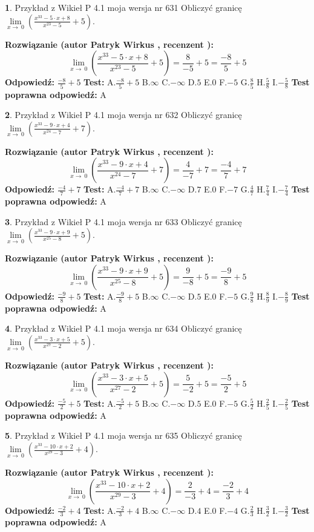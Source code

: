 \documentclass[12pt, a4paper]{article}
\theoremstyle{definition} %
\newtheorem{zad}{}
\newcommand{\zadStart}[1]{\begin{zad}#1\newline}
\newcommand{\zadStop}{\end{zad}}
\newcommand{\rozwStart}[2]{\noindent \textbf{Rozwiązanie (autor #1 , recenzent #2): }\newline}
\newcommand{\rozwStop}{\newline}
\newcommand{\odpStart}{\noindent \textbf{Odpowiedź:}\newline}
\newcommand{\odpStop}{\newline}
\newcommand{\testStart}{\noindent \textbf{Test:}\newline}
\newcommand{\testStop}{\newline}
\newcommand{\kluczStart}{\noindent \textbf{Test poprawna odpowiedź:}\newline}
\newcommand{\kluczStop}{\newline}
\begin{document}
\zadStart{Przykład z Wikieł P 4.1 moja wersja nr 631}
Obliczyć granicę $\lim\limits_{x\to\ 0}(\frac{x^{33}-5 \cdot x +8}{x^{23}-5}+5)$.
\zadStop
\rozwStart{Patryk Wirkus}{}
$$\lim\limits_{x\to\ 0}(\frac{x^{33}-5 \cdot x +8}{x^{23}-5}+5)=\frac{8}{-5}+5=\frac{-8}{5}+5$$
\rozwStop
\odpStart
$\frac{-8}{5}+5$
\odpStop
\testStart
A.$\frac{-8}{5}+5$
B.$\infty$
C.$-\infty$
D.$5$
E.$0$
F.$-5$
G.$\frac{8}{5}$
H.$\frac{5}{8}$
I.$-\frac{5}{8}$
\testStop
\kluczStart
A
\kluczStop



\zadStart{Przykład z Wikieł P 4.1 moja wersja nr 632}
Obliczyć granicę $\lim\limits_{x\to\ 0}(\frac{x^{33}-9 \cdot x +4}{x^{24}-7}+7)$.
\zadStop
\rozwStart{Patryk Wirkus}{}
$$\lim\limits_{x\to\ 0}(\frac{x^{33}-9 \cdot x +4}{x^{24}-7}+7)=\frac{4}{-7}+7=\frac{-4}{7}+7$$
\rozwStop
\odpStart
$\frac{-4}{7}+7$
\odpStop
\testStart
A.$\frac{-4}{7}+7$
B.$\infty$
C.$-\infty$
D.$7$
E.$0$
F.$-7$
G.$\frac{4}{7}$
H.$\frac{7}{4}$
I.$-\frac{7}{4}$
\testStop
\kluczStart
A
\kluczStop



\zadStart{Przykład z Wikieł P 4.1 moja wersja nr 633}
Obliczyć granicę $\lim\limits_{x\to\ 0}(\frac{x^{33}-9 \cdot x +9}{x^{25}-8}+5)$.
\zadStop
\rozwStart{Patryk Wirkus}{}
$$\lim\limits_{x\to\ 0}(\frac{x^{33}-9 \cdot x +9}{x^{25}-8}+5)=\frac{9}{-8}+5=\frac{-9}{8}+5$$
\rozwStop
\odpStart
$\frac{-9}{8}+5$
\odpStop
\testStart
A.$\frac{-9}{8}+5$
B.$\infty$
C.$-\infty$
D.$5$
E.$0$
F.$-5$
G.$\frac{9}{8}$
H.$\frac{8}{9}$
I.$-\frac{8}{9}$
\testStop
\kluczStart
A
\kluczStop



\zadStart{Przykład z Wikieł P 4.1 moja wersja nr 634}
Obliczyć granicę $\lim\limits_{x\to\ 0}(\frac{x^{33}-3 \cdot x +5}{x^{27}-2}+5)$.
\zadStop
\rozwStart{Patryk Wirkus}{}
$$\lim\limits_{x\to\ 0}(\frac{x^{33}-3 \cdot x +5}{x^{27}-2}+5)=\frac{5}{-2}+5=\frac{-5}{2}+5$$
\rozwStop
\odpStart
$\frac{-5}{2}+5$
\odpStop
\testStart
A.$\frac{-5}{2}+5$
B.$\infty$
C.$-\infty$
D.$5$
E.$0$
F.$-5$
G.$\frac{5}{2}$
H.$\frac{2}{5}$
I.$-\frac{2}{5}$
\testStop
\kluczStart
A
\kluczStop



\zadStart{Przykład z Wikieł P 4.1 moja wersja nr 635}
Obliczyć granicę $\lim\limits_{x\to\ 0}(\frac{x^{33}-10 \cdot x +2}{x^{29}-3}+4)$.
\zadStop
\rozwStart{Patryk Wirkus}{}
$$\lim\limits_{x\to\ 0}(\frac{x^{33}-10 \cdot x +2}{x^{29}-3}+4)=\frac{2}{-3}+4=\frac{-2}{3}+4$$
\rozwStop
\odpStart
$\frac{-2}{3}+4$
\odpStop
\testStart
A.$\frac{-2}{3}+4$
B.$\infty$
C.$-\infty$
D.$4$
E.$0$
F.$-4$
G.$\frac{2}{3}$
H.$\frac{3}{2}$
I.$-\frac{3}{2}$
\testStop
\kluczStart
A
\kluczStop
\end{document}
